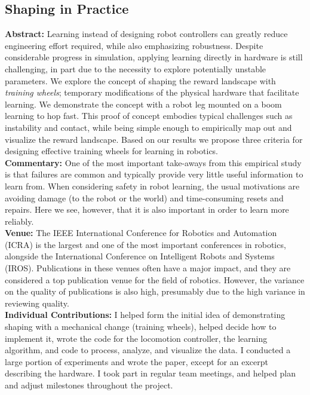 \subsection{Shaping in Practice}
\textbf{Abstract: }
Learning instead of designing robot controllers can greatly reduce engineering effort required, while also emphasizing robustness. Despite considerable progress in simulation, applying learning directly in hardware is still challenging, in part due to the necessity to explore potentially unstable parameters. We explore the concept of shaping the reward landscape with \emph{training wheels}; temporary modifications of the physical hardware that facilitate learning. We demonstrate the concept with a robot leg mounted on a boom learning to hop fast. This proof of concept embodies typical challenges such as instability and contact, while being simple enough to empirically map out and visualize the reward landscape. Based on our results we propose three criteria for designing effective training wheels for learning in robotics. \\
\textbf{Commentary: }
One of the most important take-aways from this empirical study is that failures are common and typically provide very little useful information to learn from. When considering safety in robot learning, the usual motivations are avoiding damage (to the robot or the world) and time-consuming resets and repairs. Here we see, however, that it is also important in order to learn more reliably. \\
\textbf{Venue: }
The IEEE International Conference for Robotics and Automation (ICRA) is the largest and one of the most important conferences in robotics, alongside the International Conference on Intelligent Robots and Systems (IROS). Publications in these venues often have a major impact, and they are considered a top publication venue for the field of robotics. However, the variance on the quality of publications is also high, presumably due to the high variance in reviewing quality. \\
\textbf{Individual Contributions: }
I helped form the initial idea of demonstrating shaping with a mechanical change (training wheels), helped decide how to implement it, wrote the code for the locomotion controller, the learning algorithm, and code to process, analyze, and visualize the data. I conducted a large portion of experiments and wrote the paper, except for an excerpt describing the hardware. I took part in regular team meetings, and helped plan and adjust milestones throughout the project.
